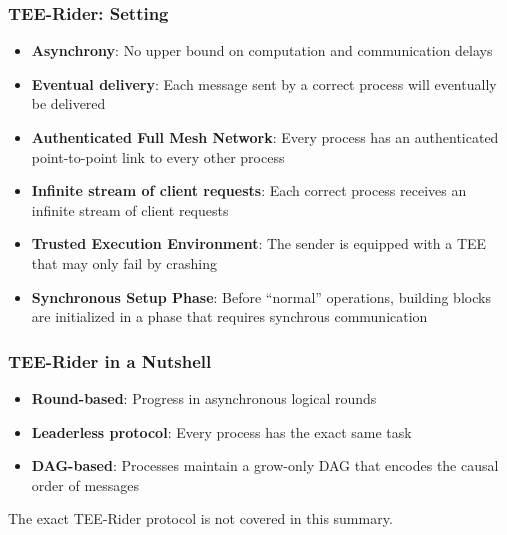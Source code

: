 \documentclass[12pt,A4]{extarticle}
\begin{document}
\subsubsection{TEE-Rider: Setting}
\begin{itemize}
  \item \textbf{Asynchrony}: No upper bound on computation and communication delays
  \item \textbf{Eventual delivery}: Each message sent by a correct process will eventually be delivered
  \item \textbf{Authenticated Full Mesh Network}: Every process has an authenticated point-to-point link to every other process
  \item \textbf{Infinite stream of client requests}: Each correct process receives an infinite stream of client requests
  \item \textbf{Trusted Execution Environment}: The sender is equipped with a TEE that may only fail by crashing
  \item \textbf{Synchronous Setup Phase}: Before ``normal'' operations, building blocks are initialized in a phase that requires synchrous communication
\end{itemize}

\subsubsection{TEE-Rider in a Nutshell}

\begin{itemize}
  \item \textbf{Round-based}: Progress in asynchronous logical rounds
  \item \textbf{Leaderless protocol}: Every process has the exact same task
  \item \textbf{DAG-based}: Processes maintain a grow-only DAG that encodes the causal order of messages
\end{itemize}
The exact TEE-Rider protocol is not covered in this summary.

\newpage


\end{document}
